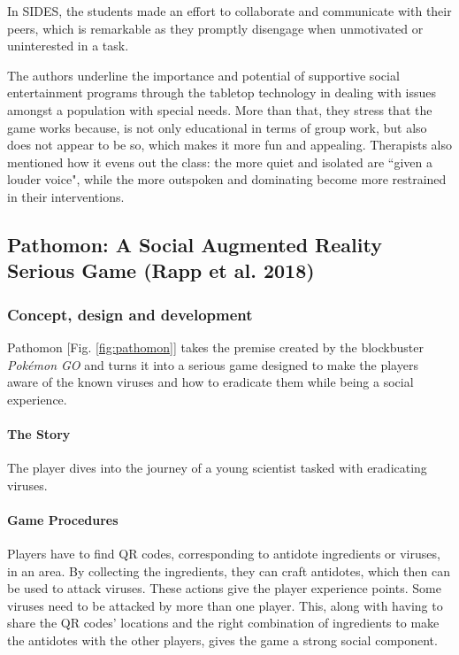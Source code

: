 \documentclass[runningheads]{llncs}
\begin{document}
\bigskip
\par In SIDES, the students made an effort to collaborate and communicate with their peers, which is remarkable as they promptly disengage when unmotivated or uninterested in a task.
\par The authors underline the importance and potential of supportive social entertainment programs through the tabletop technology in dealing with issues amongst a population with special needs. More than that, they stress that the game works because, is not only educational in terms of group work, but also does not appear to be so, which makes it more fun and appealing. Therapists also mentioned how it evens out the class: the more quiet and isolated are ``given a louder voice", while the more outspoken and dominating become more restrained in their interventions.



\subsection{Pathomon: A Social Augmented Reality Serious Game (Rapp et al. 2018)}

\subsubsection{Concept, design and development}
\par Pathomon [Fig. \ref{fig:pathomon}] takes the premise created by the blockbuster \textit{Pokémon GO} and turns it into a serious game designed to make the players aware of the known viruses and how to eradicate them while being a social experience.

\paragraph{The Story} The player dives into the journey of a young scientist tasked with eradicating viruses.

\paragraph{Game Procedures} Players have to find QR codes, corresponding to antidote ingredients or viruses, in an area. By collecting the ingredients, they can craft antidotes, which then can be used to attack viruses. These actions give the player experience points. Some viruses need to be attacked by more than one player. This, along with having to share the QR codes' locations and the right combination of ingredients to make the antidotes with the other players, gives the game a strong social component.
\end{document}
